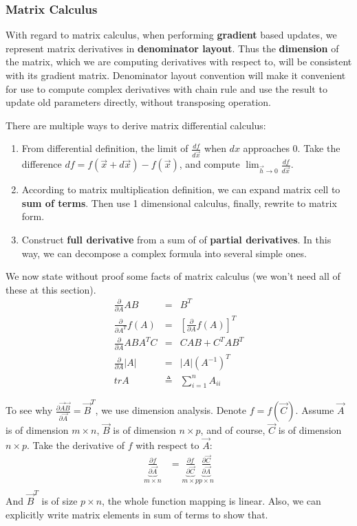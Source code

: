 \subsubsection{Matrix Calculus}
With regard to matrix calculus, when performing \textbf{gradient} based updates, we represent matrix derivatives in \textbf{denominator layout}. Thus the \textbf{dimension} of the matrix, which we are computing derivatives with respect to, will be consistent with its gradient matrix. Denominator layout convention will make it convenient for use to compute complex derivatives with chain rule and use the result to update old parameters directly, without transposing operation.

There are multiple ways to derive matrix differential calculus:
\begin{enumerate}
\item From differential definition, the limit of $\frac{df}{d\vec{x}}$ when $dx$ approaches 0. Take the difference $df = f(\vec{x} + d\vec{x}) - f(\vec{x})$, and compute $\lim_{\vec{h}\to 0} \frac{df}{d\vec{x}}$.
\item According to matrix multiplication definition, we can expand matrix cell to \textbf{sum of terms}. Then use 1 dimensional calculus, finally, rewrite to matrix form.
\item Construct \textbf{full derivative} from a sum of of \textbf{partial derivatives}. In this way, we can decompose a complex formula into several simple ones.
\end{enumerate}

We now state without proof some facts of matrix calculus (we won’t need all of these at this section).
\begin{eqnarray}
\frac{\partial}{\partial A}AB &=& B^T \\
\frac{\partial}{\partial A^T}f(A) &=& \left[\frac{\partial}{\partial A}f(A)\right]^T \label{eqn:matrix-1} \\
\frac{\partial}{\partial A}ABA^TC &=& CAB+C^TAB^T \label{eqn:matrix-2} \\
\frac{\partial}{\partial A}|A| &=& |A|(A^{-1})^T \\
trA &\triangleq& \sum\limits_{i=1}^n A_{ii} \nonumber
\end{eqnarray}

To see why $ \frac{\partial \vec{A}\vec{B}}{\partial \vec{A}} = \vec{B}^T $, we use dimension analysis. Denote $ f = f(\vec{C})$. Assume $\vec{A}$ is of dimension $m\times n$, $\vec{B}$ is of dimension $n\times p$, and of course, $\vec{C}$ is of dimension $n\times p$. Take the derivative of $f$ with respect to $\vec{A}$:
\begin{align}
\underbrace{\frac{\partial f}{\partial \vec{A}}}_{m\times n} &= \underbrace{\frac{\partial f}{\partial \vec{C}}}_{m \times p} \underbrace{\frac{\partial \vec{C}}{\partial \vec{A}}}_{p\times n} \\
\end{align}
And $\vec{B}^T$ is of size $p\times n$, the whole function mapping is linear. Also, we can explicitly write matrix elements in sum of terms to show that.

